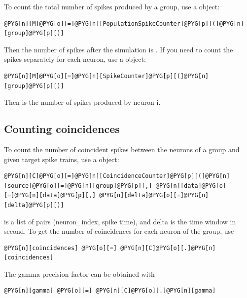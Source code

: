\documentclass[letterpaper,10pt,english]{manual}
\begin{document}
To count the total number of spikes produced by a group, use a \hyperlink{brian.PopulationSpikeCounter}{} object:

\begin{Verbatim}[commandchars=@\[\]]
@PYG[n][M]@PYG[o][=]@PYG[n][PopulationSpikeCounter]@PYG[p][(]@PYG[n][group]@PYG[p][)]
\end{Verbatim}

Then the number of spikes after the simulation is . If you need to count the spikes
separately for each neuron, use a \hyperlink{brian.SpikeCounter}{} object:

\begin{Verbatim}[commandchars=@\[\]]
@PYG[n][M]@PYG[o][=]@PYG[n][SpikeCounter]@PYG[p][(]@PYG[n][group]@PYG[p][)]
\end{Verbatim}

Then  is the number of spikes produced by neuron i.


\subsection{Counting coincidences}

To count the number of coincident spikes between the neurons of a group
and given target spike trains, use a \hyperlink{brian.CoincidenceCounter}{} object:

\begin{Verbatim}[commandchars=@\[\]]
@PYG[n][C]@PYG[o][=]@PYG[n][CoincidenceCounter]@PYG[p][(]@PYG[n][source]@PYG[o][=]@PYG[n][group]@PYG[p][,] @PYG[n][data]@PYG[o][=]@PYG[n][data]@PYG[p][,] @PYG[n][delta]@PYG[o][=]@PYG[n][delta]@PYG[p][)]
\end{Verbatim}

 is a list of pairs (neuron\_index, spike time), and delta is the time window
in second. To get the number of coincidences for each neuron of the group, use

\begin{Verbatim}[commandchars=@\[\]]
@PYG[n][coincidences] @PYG[o][=] @PYG[n][C]@PYG[o][.]@PYG[n][coincidences]
\end{Verbatim}

The gamma precision factor can be obtained with

\begin{Verbatim}[commandchars=@\[\]]
@PYG[n][gamma] @PYG[o][=] @PYG[n][C]@PYG[o][.]@PYG[n][gamma]
\end{Verbatim}
\end{document}
